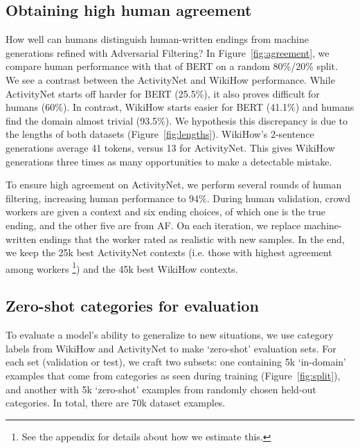 \subsection{Obtaining high human agreement}

How well can humans distinguish human-written endings from machine generations refined with Adversarial Filtering? In Figure~\ref{fig:agreement}, we compare human performance with that of BERT on a random 80\%/20\% split. We see a contrast between the ActivityNet and WikiHow performance. While ActivityNet starts off harder for BERT (25.5\%), it also proves difficult for humans (60\%). In contrast, WikiHow starts easier for BERT (41.1\%) and humans find the domain almost trivial (93.5\%).
We hypothesis this discrepancy is due to the lengths of both datasets (Figure~\ref{fig:lengths}). WikiHow's 2-sentence generations average 41 tokens, versus 13 for ActivityNet. This gives WikiHow generations three times as many opportunities to make a detectable mistake. 

To ensure high agreement on ActivityNet, we perform several rounds of human filtering, increasing human performance to 94\%. During human validation, crowd workers are given a context and six ending choices, of which one is the true ending, and the other five are from AF. On each iteration, we replace machine-written endings that the worker rated as realistic with new samples. In the end, we keep the 25k best ActivityNet contexts (i.e. those with highest agreement among workers
\footnote{See the appendix for details about how we estimate this.}) and the 45k best WikiHow contexts. 

\subsection{Zero-shot categories for evaluation} To evaluate a model's ability to generalize to new situations, we use category labels from WikiHow and ActivityNet to make `zero-shot' evaluation sets. For each set (validation or test), we craft two subsets: one containing 5k `in-domain' examples that come from categories as seen during training (Figure~\ref{fig:split}), and another with 5k `zero-shot' examples from randomly chosen held-out categories. In total, there are 70k dataset examples. 


\newcommand{\best}[1]{\textbf{#1}}

\newcommand{\scnd}[1]{#1}

